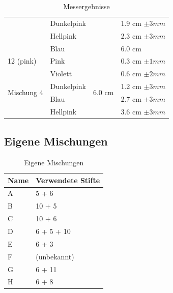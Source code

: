 \documentclass[11pt,paper=a4,final]{scrartcl}
\begin{document}
\begin{savenotes}
\begin{table}[ht!]
\begin{tabular}{|l|l|l|l|}
      			& Dunkelpink	&				& 1.9 cm \(\pm 3 mm \)	\\
      			& Hellpink	&				& 2.3 cm \(\pm 3 mm \)	\\
      			& Blau		&				& 6.0 cm		\\ \cline{1-2} \cline{4-4}
      12 (pink)		& Pink		&				& 0.3 cm \(\pm 1 mm \)	\\ \hline
      \multirow{4}{*}{Mischung 4}
      			& Violett	& \multirow{4}{*}{6.0 cm }	& 0.6 cm \(\pm 2 mm \)	\\
      			& Dunkelpink	&				& 1.2 cm \(\pm 3 mm \)	\\
			& Blau		& 				& 2.7 cm \(\pm 3 mm \)	\\
      			& Hellpink	& 				& 3.6 cm \(\pm 3 mm \)	\\ \hline
      	
    \end{tabular}
    \caption{Messergebnisse}
  \end{table}
\end{savenotes}

\subsection{Eigene Mischungen}
\begin{savenotes}
  \begin{table}[ht!]
    \centering
    \begin{tabular}{|l|l|}
      \hline
      \bf Name & \bf Verwendete Stifte	\\ \hline
      A & 5 + 6 			\\ \hline
      B & 10 + 5			\\ \hline
      C & 10 + 6 			\\ \hline
      D & 6 + 5 + 10			\\ \hline
      E & 6 + 3				\\ \hline
      F & (unbekannt)			\\ \hline
      G & 6 + 11			\\ \hline
      H & 6 + 8				\\ \hline
    \end{tabular}
    \caption{Eigene Mischungen}
  \end{table}
\end{savenotes}
\end{document}
